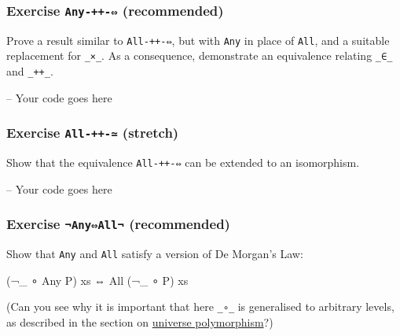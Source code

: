 \hypertarget{exercise-any---recommended}{%
\subsubsection{\texorpdfstring{Exercise \texttt{Any-++-⇔}
(recommended)}{Exercise Any-++-⇔ (recommended)}}\label{exercise-any---recommended}}

Prove a result similar to \texttt{All-++-⇔}, but with \texttt{Any} in
place of \texttt{All}, and a suitable replacement for \texttt{\_×\_}. As
a consequence, demonstrate an equivalence relating \texttt{\_∈\_} and
\texttt{\_++\_}.

\begin{fence}
\begin{code}
-- Your code goes here
\end{code}
\end{fence}

\hypertarget{exercise-all---stretch}{%
\subsubsection{\texorpdfstring{Exercise \texttt{All-++-≃}
(stretch)}{Exercise All-++-≃ (stretch)}}\label{exercise-all---stretch}}

Show that the equivalence \texttt{All-++-⇔} can be extended to an
isomorphism.

\begin{fence}
\begin{code}
-- Your code goes here
\end{code}
\end{fence}

\hypertarget{exercise-anyall-recommended}{%
\subsubsection{\texorpdfstring{Exercise \texttt{¬Any⇔All¬}
(recommended)}{Exercise ¬Any⇔All¬ (recommended)}}\label{exercise-anyall-recommended}}

Show that \texttt{Any} and \texttt{All} satisfy a version of De Morgan's
Law:

\begin{myDisplay}
(¬_ ∘ Any P) xs ⇔ All (¬_ ∘ P) xs
\end{myDisplay}

(Can you see why it is important that here \texttt{\_∘\_} is generalised
to arbitrary levels, as described in the section on
\protect\hyperlink{Equality-unipoly}{universe polymorphism}?)

